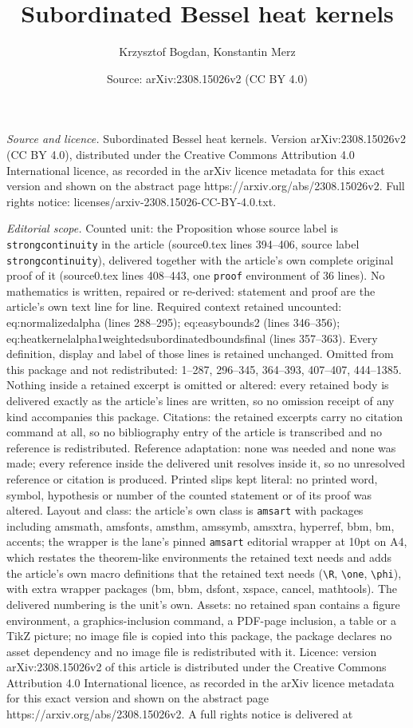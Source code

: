 \documentclass[10pt,a4paper]{amsart}
\title[Subordinated Bessel heat kernels]{Subordinated Bessel heat kernels}
\author{Krzysztof Bogdan, Konstantin Merz}
\date{Source: arXiv:2308.15026v2 (CC BY 4.0)}
\begin{document}
\maketitle

\noindent\emph{Source and licence.} Subordinated Bessel heat kernels. Version arXiv:2308.15026v2 (CC BY 4.0), distributed under the Creative Commons Attribution 4.0 International licence, as recorded in the arXiv licence metadata for this exact version and shown on the abstract page https://arxiv.org/abs/2308.15026v2. Full rights notice: licenses/arxiv-2308.15026-CC-BY-4.0.txt.\par\smallskip

\noindent\textit{Editorial scope.} Counted unit: the Proposition whose source label is \texttt{strongcontinuity} in the article (source0.tex lines 394--406, source label \texttt{strongcontinuity}), delivered together with the article's own complete original proof of it (source0.tex lines 408--443, one \texttt{proof} environment of 36 lines). No mathematics is written, repaired or re-derived: statement and proof are the article's own text line for line. Required context retained uncounted: eq:normalizedalpha (lines 288--295); eq:easybounds2 (lines 346--356); eq:heatkernelalpha1weightedsubordinatedboundsfinal (lines 357--363). Every definition, display and label of those lines is retained unchanged. Omitted from this package and not redistributed: 1--287, 296--345, 364--393, 407--407, 444--1385. Nothing inside a retained excerpt is omitted or altered: every retained body is delivered exactly as the article's lines are written, so no omission receipt of any kind accompanies this package. Citations: the retained excerpts carry no citation command at all, so no bibliography entry of the article is transcribed and no reference is redistributed. Reference adaptation: none was needed and none was made; every reference inside the delivered unit resolves inside it, so no unresolved reference or citation is produced. Printed slips kept literal: no printed word, symbol, hypothesis or number of the counted statement or of its proof was altered. Layout and class: the article's own class is \texttt{amsart} with packages including amsmath, amsfonts, amsthm, amssymb, amsxtra, hyperref, bbm, bm, accents; the wrapper is the lane's pinned \texttt{amsart} editorial wrapper at 10pt on A4, which restates the theorem-like environments the retained text needs and adds the article's own macro definitions that the retained text needs (\texttt{\textbackslash R}, \texttt{\textbackslash one}, \texttt{\textbackslash phi}), with extra wrapper packages (bm, bbm, dsfont, xspace, cancel, mathtools). The delivered numbering is the unit's own. Assets: no retained span contains a figure environment, a graphics-inclusion command, a PDF-page inclusion, a table or a TikZ picture; no image file is copied into this package, the package declares no asset dependency and no image file is redistributed with it. Licence: version arXiv:2308.15026v2 of this article is distributed under the Creative Commons Attribution 4.0 International licence, as recorded in the arXiv licence metadata for this exact version and shown on the abstract page https://arxiv.org/abs/2308.15026v2. A full rights notice is delivered at 
\end{document}
